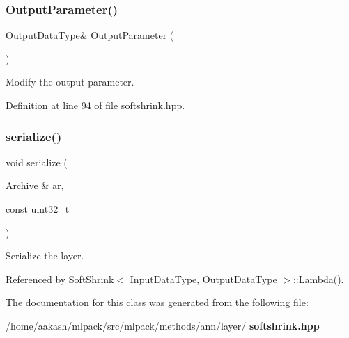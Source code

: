 \subsubsection{Output\+Parameter()\hspace{0.1cm}{\footnotesize\ttfamily [2/2]}}
{\footnotesize\ttfamily Output\+Data\+Type\& Output\+Parameter (\begin{DoxyParamCaption}{ }\end{DoxyParamCaption})\hspace{0.3cm}{\ttfamily [inline]}}



Modify the output parameter. 



Definition at line 94 of file softshrink.\+hpp.

\mbox{\label{classmlpack_1_1ann_1_1SoftShrink_a65cba07328997659bec80b9879b15a51}} 
\subsubsection{serialize()}
{\footnotesize\ttfamily void serialize (\begin{DoxyParamCaption}\item[{Archive \&}]{ar,  }\item[{const uint32\+\_\+t}]{ }\end{DoxyParamCaption})}



Serialize the layer. 



Referenced by Soft\+Shrink$<$ Input\+Data\+Type, Output\+Data\+Type $>$\+::\+Lambda().



The documentation for this class was generated from the following file\+:\begin{DoxyCompactItemize}
\item 
/home/aakash/mlpack/src/mlpack/methods/ann/layer/\textbf{ softshrink.\+hpp}\end{DoxyCompactItemize}
